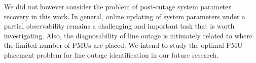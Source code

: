 We did not however consider the problem of post-outage system parameter recovery in this work. In general, online updating of system parameters under a partial observability remains a challenging and important task that is worth investigating. Also, the diagnosability of line outage is intimately related to where the limited number of PMUs are placed. We intend to study the optimal PMU placement problem for line outage identification in our future research. 